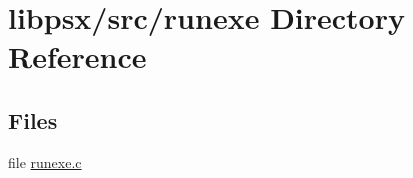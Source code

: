 \hypertarget{dir_000013}{}\section{libpsx/src/runexe Directory Reference}
\label{dir_000013}
\subsection*{Files}
\begin{DoxyCompactItemize}
\item 
file \hyperlink{runexe_8c}{runexe.\+c}
\end{DoxyCompactItemize}

